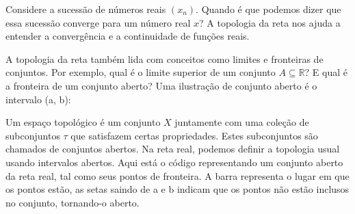 \documentclass[Analysis/analysis_notes.tex]{subfiles}
\begin{document}
Considere a sucessão de números reais $(x_n)$. Quando é que podemos dizer que essa sucessão converge para um número real $x$? A topologia da reta nos ajuda a entender a convergência e a continuidade de funções reais.

\begin{center}
\end{center}

A topologia da reta também lida com conceitos como limites e fronteiras de conjuntos. Por exemplo, qual é o limite superior de um conjunto $A \subseteq \mathbb{R}$? E qual é a fronteira de um conjunto aberto?
Uma ilustra\c c\~ao de conjunto aberto \'e o intervalo (a, b):

\begin{center}
\end{center}

Um espaço topológico é um conjunto $X$ juntamente com uma coleção de subconjuntos $\tau$ que satisfazem certas propriedades. Estes subconjuntos são chamados de conjuntos abertos. Na reta real, podemos definir a topologia usual usando intervalos abertos.
Aqui est\'a o c\'odigo representando um conjunto aberto da reta real, tal como seus pontos de fronteira. A barra representa o lugar em que
os pontos est\~ao, as setas saindo de a e b indicam que os pontos n\~ao est\~ao inclusos no conjunto, tornando-o aberto.
\end{document}
